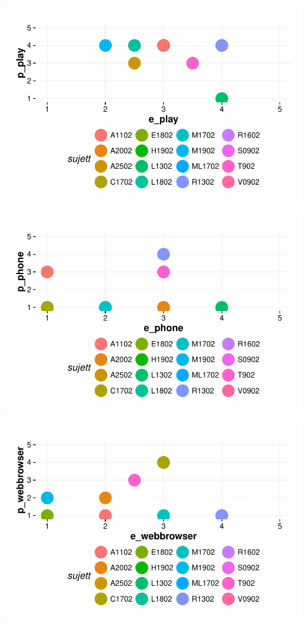 \documentclass{article}
\begin{document}
\includegraphics{interviews-plot_coirs_parent_enfant_play}

\includegraphics{interviews-plot_coirs_parent_enfant_phone}

\includegraphics{interviews-plot_coirs_parent_enfant_webbrowser}
\end{document}
